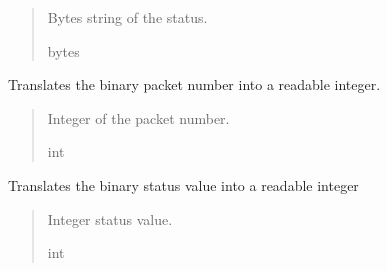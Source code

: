 \documentclass[letterpaper,10pt,english]{sphinxmanual}
\begin{document}
\begin{fulllineitems}
\begin{fulllineitems}
\begin{quote}
\begin{description}
\sphinxAtStartPar
Bytes string of the status.

\sphinxAtStartPar
bytes

\end{description}\end{quote}

\end{fulllineitems}


\begin{fulllineitems}
\label{\detokenize{Morelia.Packets:Morelia.Packets.Binary5.PacketBinary5.PacketNumber}}
\pysigstartsignatures
{}
\pysigstopsignatures
\sphinxAtStartPar
Translates the binary packet number into a readable integer.
\begin{quote}\begin{description}
\sphinxAtStartPar
Integer of the packet number.

\sphinxAtStartPar
int

\end{description}\end{quote}

\end{fulllineitems}


\begin{fulllineitems}
\label{\detokenize{Morelia.Packets:Morelia.Packets.Binary5.PacketBinary5.Status}}
\pysigstartsignatures
{}
\pysigstopsignatures
\sphinxAtStartPar
Translates the binary status value into a readable integer
\begin{quote}\begin{description}
\sphinxAtStartPar
Integer status value.

\sphinxAtStartPar
int

\end{description}\end{quote}


\end{fulllineitems}
\end{fulllineitems}
\end{document}
